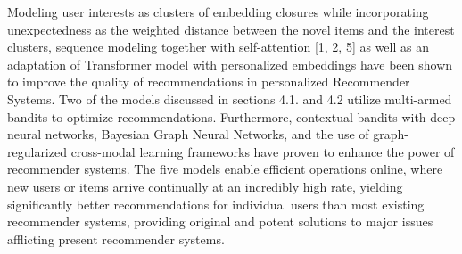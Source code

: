 Modeling user interests as clusters of embedding closures while incorporating unexpectedness as the weighted distance between the novel items and the interest clusters, sequence modeling together with self-attention [1, 2, 5] as well as an adaptation of Transformer model with personalized embeddings have been shown to improve the quality of recommendations in personalized Recommender Systems. Two of the models discussed in sections  4.1. and 4.2 utilize multi-armed bandits to optimize recommendations. Furthermore, contextual bandits with deep neural networks, Bayesian Graph Neural Networks, and the use of graph-regularized cross-modal learning frameworks have proven to enhance the power of recommender systems. The five models enable efficient operations online, where new users or items arrive continually at an incredibly high rate, yielding significantly better recommendations for individual users than most existing recommender systems, providing original and potent solutions to major issues afflicting present recommender systems.